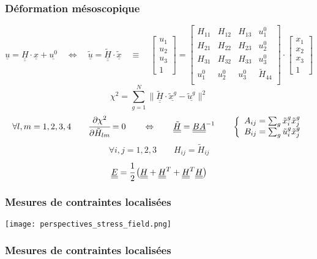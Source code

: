 \documentclass[8pt]{beamer}
\def\doubleunderline#1{\underline{\underline{#1}}}
\newcommand{\ddelta}[2]{\cfrac{\partial #1}{\partial #2}}
\begin{document}
\begin{frame}
	\frametitle{Déformation mésoscopique}
	\vfill
	$$
	\underline{u} = \doubleunderline{H}\cdot\underline{x} + \underline{u^0}
	\quad\Leftrightarrow\quad
	\underline{\tilde{u}} = \doubleunderline{\tilde{H}}\cdot\underline{\tilde{x}}
	\quad\equiv\quad
	\begin{bmatrix}
		u_1\\u_2\\u_3\\1
	\end{bmatrix} = \begin{bmatrix}
		H_{11} & H_{12} & H_{13} & u_1^0 \\
		H_{21} & H_{22} & H_{23} & u_2^0 \\
		H_{31} & H_{32} & H_{33} & u_3^0 \\
		u_1^0 & u_2^0 & u_3^0 & \tilde{H}_{44} \\
	\end{bmatrix} \cdot \begin{bmatrix}
		x_1\\x_2\\x_3\\1
	\end{bmatrix}
	$$\vfill
	$$
	\chi^2 = \sum_{g=1}^{N} \lVert \doubleunderline{\tilde{H}}\cdot\underline{\tilde{x}^g} - \underline{\tilde{u}^g} \rVert^2
	$$\vfill
	$$
	\forall l,m = 1,2,3,4\qquad
	\ddelta{\chi^2}{\tilde{H}_{lm}} = 0
	\qquad\Leftrightarrow\qquad
	\doubleunderline{\tilde{H}} = \doubleunderline{B}\doubleunderline{A}^{-1}
	\qquad \left\{\begin{array}{l}
	A_{ij} = \sum_g \tilde{x}_i^g\tilde{x}_j^g\\
	B_{ij} = \sum_g \tilde{u}_i^g\tilde{x}_j^g
	\end{array}\right.
	$$\vfill
	$$
	\forall i,j = 1,2,3 \qquad
	H_{ij} = \tilde{H}_{ij}
	$$\vfill
	$$
	\doubleunderline{E} = \cfrac{1}{2} \left(
	\doubleunderline{H} + \doubleunderline{H}^T + \doubleunderline{H}^T\doubleunderline{H}
	\right)
	$$\vfill
\end{frame}

\begin{frame}
	\frametitle{Mesures de contraintes localisées}
	\centering
	\texttt{[image: perspectives\_stress\_field.png]}
\end{frame}
\begin{frame}
	\frametitle{Mesures de contraintes localisées}
	\centering\vfill
	\vfill
\end{frame}
\end{document}
